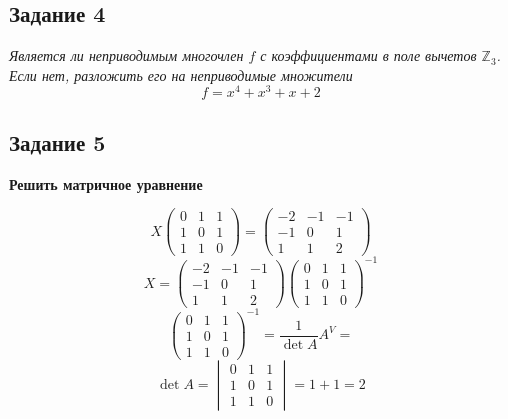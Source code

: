 \documentclass[a4paper]{article}
\theoremstyle{definition}
\theoremstyle{plain}
\begin{document}
\subsection*{Задание 4}

\emph{Является ли неприводимым многочлен $f$ с коэффициентами в поле вычетов $\mathbb{Z}_{3}$.
Если нет, разложить его на неприводимые множители}
\[
f = x^{4} + x^{3} + x + 2
\]

\subsection*{Задание 5}
\textbf{Решить матричное уравнение}

\begin{equation*}
  X
  \begin{pmatrix}
    0 & 1 & 1\\
    1 & 0 & 1\\
    1 & 1 & 0
  \end{pmatrix}
  =
  \begin{pmatrix}
    -2 & -1 & -1\\
    -1 & 0 & 1\\
    1 & 1 & 2
  \end{pmatrix}
\end{equation*}
\begin{equation*}
  X
  =
  \begin{pmatrix}
    -2 & -1 & -1\\
    -1 & 0 & 1\\
    1 & 1 & 2
  \end{pmatrix}
  \begin{pmatrix}
    0 & 1 & 1\\
    1 & 0 & 1\\
    1 & 1 & 0
  \end{pmatrix}^{-1}
\end{equation*}
\begin{equation}\label{eq:1}
  \begin{pmatrix}
    0 & 1 & 1\\
    1 & 0 & 1\\
    1 & 1 & 0
  \end{pmatrix}^{-1}
  =
  \frac{1}{\det A}A^{V} =
\end{equation}
\begin{equation*}
  \det A =
  \begin{vmatrix}
    0 & 1 & 1\\
    1 & 0 & 1\\
    1 & 1 & 0
  \end{vmatrix}
  =
  1 + 1
  =
  2
\end{equation*}
\end{document}
